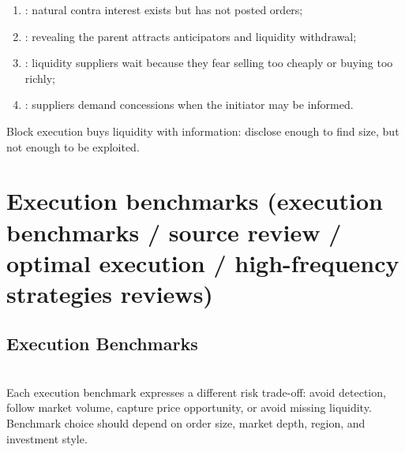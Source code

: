 \documentclass[a4paper,oneside,openany]{book}
\begin{document}
\begin{taxonomy} 
\begin{enumerate}[label=\roman*.]
\setlength{\itemsep}{0pt}
\item {}: natural contra interest exists but has not posted orders;
\item {}: revealing the parent attracts anticipators and liquidity withdrawal;
\item {}: liquidity suppliers wait because they fear selling too cheaply or buying too richly;
\item {}: suppliers demand concessions when the initiator may be informed.
\end{enumerate}
Block execution buys liquidity with information: disclose enough to find size, but not enough to be exploited.
\end{taxonomy}

\section*{Execution benchmarks (execution benchmarks / source review / optimal execution / high-frequency strategies reviews)}

\subsection*{Execution Benchmarks}

\begin{principle} \\
Each execution benchmark expresses a different risk trade-off: avoid detection, follow market volume, capture price opportunity, or avoid missing liquidity. Benchmark choice should depend on order size, market depth, region, and investment style.
\end{principle}
\end{document}
